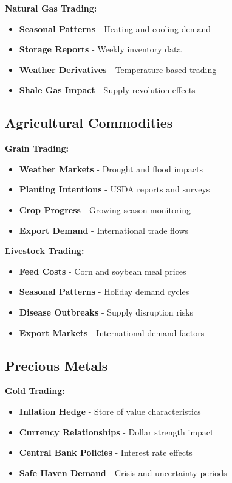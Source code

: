 \documentclass[12pt]{article}
\begin{document}
\textbf{Natural Gas Trading:}
\begin{itemize}
    \item \textbf{Seasonal Patterns} - Heating and cooling demand
    \item \textbf{Storage Reports} - Weekly inventory data
    \item \textbf{Weather Derivatives} - Temperature-based trading
    \item \textbf{Shale Gas Impact} - Supply revolution effects
\end{itemize}

\subsection{Agricultural Commodities}

\textbf{Grain Trading:}
\begin{itemize}
    \item \textbf{Weather Markets} - Drought and flood impacts
    \item \textbf{Planting Intentions} - USDA reports and surveys
    \item \textbf{Crop Progress} - Growing season monitoring
    \item \textbf{Export Demand} - International trade flows
\end{itemize}

\textbf{Livestock Trading:}
\begin{itemize}
    \item \textbf{Feed Costs} - Corn and soybean meal prices
    \item \textbf{Seasonal Patterns} - Holiday demand cycles
    \item \textbf{Disease Outbreaks} - Supply disruption risks
    \item \textbf{Export Markets} - International demand factors
\end{itemize}

\subsection{Precious Metals}

\textbf{Gold Trading:}
\begin{itemize}
    \item \textbf{Inflation Hedge} - Store of value characteristics
    \item \textbf{Currency Relationships} - Dollar strength impact
    \item \textbf{Central Bank Policies} - Interest rate effects
    \item \textbf{Safe Haven Demand} - Crisis and uncertainty periods
\end{itemize}
\end{document}

